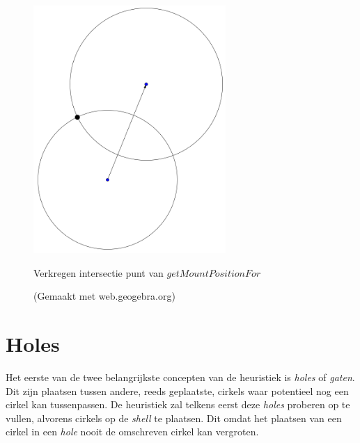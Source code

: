 \documentclass[12pt,a4paper,oneside]{book}
\begin{document}
\begin{figure}
  \centering
  \includegraphics[width=0.65\textwidth]{cirkel-cirkel-intersectie.png}
  \caption{Verkregen intersectie punt van $getMountPositionFor$} \label{fig:cirkel-cirkel-intersectie} 
  \caption*{(Gemaakt met web.geogebra.org)}
\end{figure}

\section{Holes} \label{sec:holes}

Het eerste van de twee belangrijkste concepten van de heuristiek is \textit{holes} of \textit{gaten}.
Dit zijn plaatsen tussen andere, reeds geplaatste, cirkels waar potentieel nog een cirkel kan tussenpassen.
De heuristiek zal telkens eerst deze \textit{holes} proberen op te vullen, alvorens cirkels op de \textit{shell} te plaatsen.
Dit omdat het plaatsen van een cirkel in een \textit{hole} nooit de omschreven cirkel kan vergroten.
\end{document}
